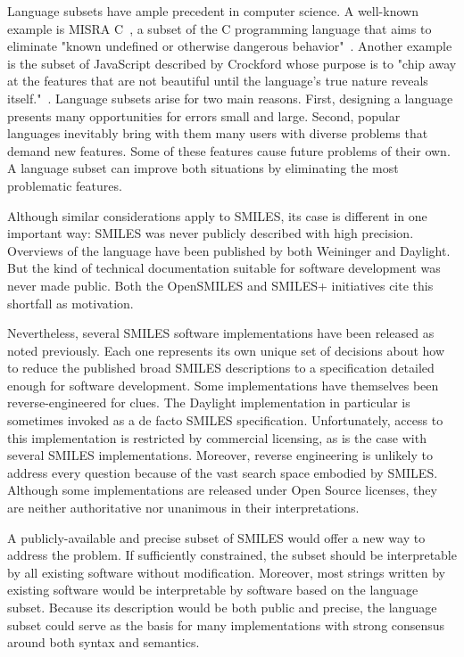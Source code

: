 \documentclass{article}
\begin{document}
Language subsets have ample precedent in computer science. A well-known example is MISRA C~\cite{misraC}, a subset of the C programming language that aims to eliminate "known undefined or otherwise dangerous behavior"~\cite{hatton:2007}. Another example is the subset of JavaScript described by Crockford whose purpose is to "chip away at the features that are not beautiful until the language's true nature reveals itself."~\cite{crockford:2008}. Language subsets arise for two main reasons. First, designing a language presents many opportunities for errors small and large. Second, popular languages inevitably bring with them many users with diverse problems that demand new features. Some of these features cause future problems of their own. A language subset can improve both situations by eliminating the most problematic features.

Although similar considerations apply to SMILES, its case is different in one important way: SMILES was never publicly described with high precision. Overviews of the language have been published by both Weininger and Daylight. But the kind of technical documentation suitable for software development was never made public. Both the OpenSMILES and SMILES+ initiatives cite this shortfall as motivation.

Nevertheless, several SMILES software implementations have been released as noted previously. Each one represents its own unique set of decisions about how to reduce the published broad SMILES descriptions to a specification detailed enough for software development. Some implementations have themselves been reverse-engineered for clues. The Daylight implementation in particular is sometimes invoked as a de facto SMILES specification. Unfortunately, access to this implementation is restricted by commercial licensing, as is the case with several SMILES implementations. Moreover, reverse engineering is unlikely to address every question because of the vast search space embodied by SMILES. Although some implementations are released under Open Source licenses, they are neither authoritative nor unanimous in their interpretations.

A publicly-available and precise subset of SMILES would offer a new way to address the problem. If sufficiently constrained, the subset should be interpretable by all existing software without modification. Moreover, most strings written by existing software would be interpretable by software based on the language subset. Because its description would be both public and precise, the language subset could serve as the basis for many implementations with strong consensus around both syntax and semantics.
\end{document}
